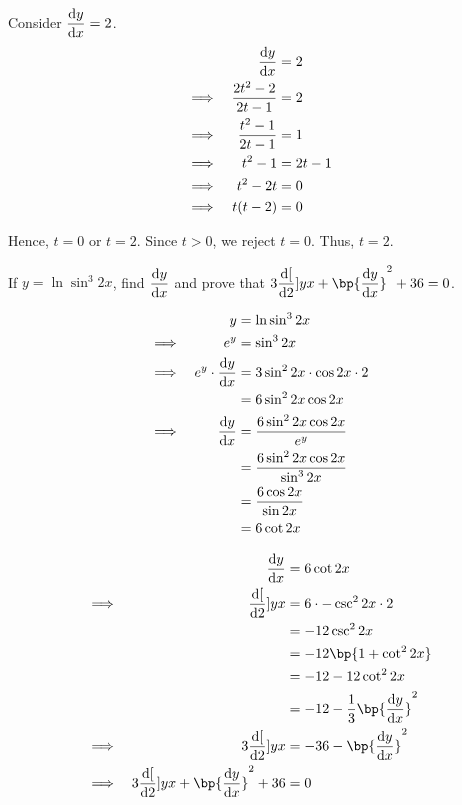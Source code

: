 \documentclass{echw}
\begin{document}
        Consider $\dfrac{\mathrm{d} y}{\mathrm{d} x} = 2$.
        \begin{alignat*}{2}
            &&\dfrac{\mathrm{d} y}{\mathrm{d} x} &= 2\\
            \implies&&\dfrac{2t^2 - 2}{2t - 1} &= 2\\
            \implies&&\dfrac{t^2 - 1}{2t - 1} &= 1\\
            \implies&&t^2 - 1 &= 2t -1\\
            \implies&&t^2 - 2t &= 0\\
            \implies&&t(t-2) &= 0
        \end{alignat*}

        Hence, $t = 0$ or $t = 2$. Since $t > 0$, we reject $t = 0$. Thus, $t = 2$.


    \problem{}
        If $y = \ln{\sin^3 2x}$, find $\dfrac{\mathrm{d} y}{\mathrm{d} x}$ and prove that $3\der[2]{y}{x} + \bp{\der{y}{x}}^2 + 36 = 0$.

    \solution
        \begin{alignat*}{2}
            &&y &= \ln{\sin^3 2x}\\
            \implies&&e^y &= \sin^3 2x\\
            \implies&&e^y \cdot \dfrac{\mathrm{d} y}{\mathrm{d} x} &= 3\sin^2 2x \cdot \cos 2x \cdot 2\\
            && &= 6\sin^2 2x \cos 2x\\
            \implies&& \dfrac{\mathrm{d} y}{\mathrm{d} x} &= \dfrac{6\sin^2 2x \cos 2x}{e^y}\\
            && &= \dfrac{6\sin^2 2x \cos 2x}{\sin^3 2x}\\
            && &= \dfrac{6 \cos 2x}{\sin 2x}\\
            && &= 6 \cot 2x
        \end{alignat*}
        

        \begin{alignat*}{2}
            &&\der{y}{x} &= 6\cot 2x\\
            \implies&&\der[2]{y}{x} &= 6 \cdot -\csc^2 2x \cdot 2\\
            && &= -12 \csc^2 2x\\
            && &= -12 \bp{1 + \cot^2 2x}\\
            && &= -12 - 12\cot^2 2x\\
            && &= -12 - \dfrac13 \bp{\der{y}{x}}^2\\
            \implies&&3\der[2]{y}{x} &= -36 - \bp{\der{y}{x}}^2\\
            \implies&& 3\der[2]{y}{x} + \bp{\der{y}{x}}^2 + 36 &= 0
        \end{alignat*}
\end{document}
